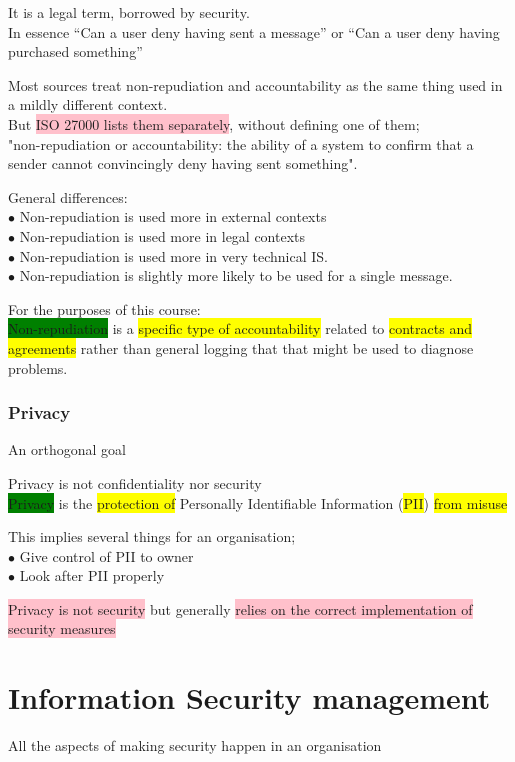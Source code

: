 \documentclass[tikz,border=10pt]{project_plan}
\newcommand{\bulletPoint}{\hspace{-3.1pt}$\bullet$ \hspace{5pt}}
\begin{document}
It is a legal term, borrowed by security. \\
In essence “Can a user deny having sent a message” or “Can a user deny having purchased something”

Most sources treat non-repudiation and accountability as the same thing used in a mildly different context.\\
But \colorbox{pink}{ISO 27000 lists them separately}, without defining one of them;\\
"non-repudiation or accountability: the ability of a system to confirm that a sender cannot convincingly deny having sent something".

General differences: \\
\bulletPoint Non-repudiation is used more in external contexts\\
\bulletPoint Non-repudiation is used more in legal contexts\\
\bulletPoint Non-repudiation is used more in very technical IS.\\
\bulletPoint Non-repudiation is slightly more likely to be used for a single message.

For the purposes of this course:\\
\colorbox{green}{Non-repudiation} is a \colorbox{yellow}{specific type of accountability} related to \colorbox{yellow}{contracts and agreements} rather than general logging that that might be used to diagnose problems.

\subsubsection{Privacy}
An orthogonal goal

Privacy is not confidentiality nor security\\
\colorbox{green}{Privacy} is the \colorbox{yellow}{protection of} Personally Identifiable Information (\colorbox{yellow}{PII}) \colorbox{yellow}{from misuse}

This implies several things for an organisation;\\
\bulletPoint Give control of PII to owner\\
\bulletPoint Look after PII properly

\colorbox{pink}{Privacy is not security} but generally \colorbox{pink}{relies on the correct implementation of security measures}

\section{Information Security management}
All the aspects of making security happen in an organisation
\end{document}
